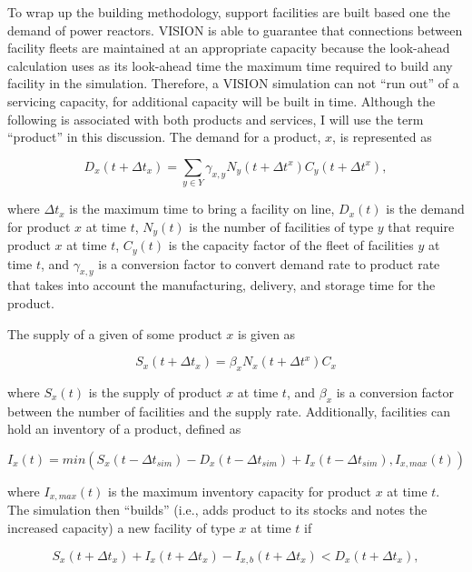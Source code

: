 To wrap up the building methodology, support facilities are built based one the
demand of power reactors. VISION is able to guarantee that connections between
facility fleets are maintained at an appropriate capacity because the look-ahead
calculation uses as its look-ahead time the maximum time required to build any
facility in the simulation. Therefore, a VISION simulation can not ``run out''
of a servicing capacity, for additional capacity will be built in time. Although
the following is associated with both products and services, I will use the term
``product'' in this discussion. The demand for a product, $x$, is
represented as

\begin{equation}
D_x(t + \Delta t_x) = \sum_{y \in Y} \gamma_{x,y} N_y(t + \Delta t^x) C_y(t + \Delta t^x),
\end{equation}

where $\Delta t_x$ is the maximum time to bring a facility on line, $D_x(t)$ is
the demand for product $x$ at time $t$, $N_y(t)$ is the number of
facilities of type $y$ that require product $x$ at time $t$, $C_y(t)$ is
the capacity factor of the fleet of facilities $y$ at time $t$, and
$\gamma_{x,y}$ is a conversion factor to convert demand rate to product
rate that takes into account the manufacturing, delivery, and storage time for
the product.

The supply of a given of some product $x$ is given as

\begin{equation}
S_x(t + \Delta t_x) = \beta_x N_x(t + \Delta t^x) C_x
\end{equation}

where $S_x(t)$ is the supply of product $x$ at time $t$, and $\beta_x$ is a
conversion factor between the number of facilities and the supply
rate. Additionally, facilities can hold an inventory of a product, defined as

\begin{equation}
I_x(t) = min \left( S_x(t-\Delta t_{sim}) - D_x(t-\Delta t_{sim}) 
       + I_x(t-\Delta t_{sim}), I_{x,max}(t) \right)
\end{equation}

where $I_{x,max}(t)$ is the maximum inventory capacity for product $x$ at time
$t$. The simulation then ``builds'' (i.e., adds product to its stocks and notes
the increased capacity) a new facility of type $x$ at time $t$ if 

\begin{equation}
S_x(t + \Delta t_x) + I_x(t + \Delta t_x) - 
      I_{x,b}(t + \Delta t_x) < D_x(t + \Delta t_x),
\end{equation}

